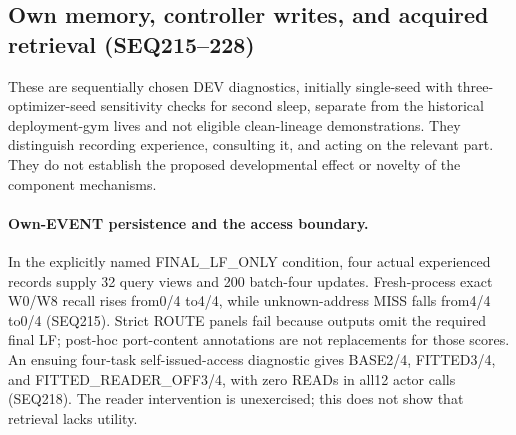 \documentclass{article}
\begin{document}
\subsection{Own memory, controller writes, and acquired retrieval (SEQ215--228)}
\label{sec:seq223}
These are sequentially chosen DEV diagnostics, initially single-seed with
three-optimizer-seed sensitivity checks for second sleep, separate from the
historical deployment-gym lives and not eligible clean-lineage demonstrations.
They distinguish recording experience, consulting it, and acting on the relevant
part. They do not establish the proposed developmental effect or novelty of the
component mechanisms.

\paragraph{Own-EVENT persistence and the access boundary.}
In the explicitly named FINAL\_LF\_ONLY condition, four actual experienced
records supply 32 query views and 200 batch-four updates. Fresh-process exact
W0/W8 recall rises from0/4 to4/4, while unknown-address MISS falls from4/4 to0/4
(SEQ215). Strict ROUTE panels fail because outputs omit the required final LF;
post-hoc port-content annotations are not replacements for those scores.
An ensuing four-task self-issued-access diagnostic gives BASE2/4,
FITTED3/4, and FITTED\_READER\_OFF3/4, with zero READs in all12 actor calls
(SEQ218). The reader intervention is unexercised; this does not show that
retrieval lacks utility.
\end{document}

